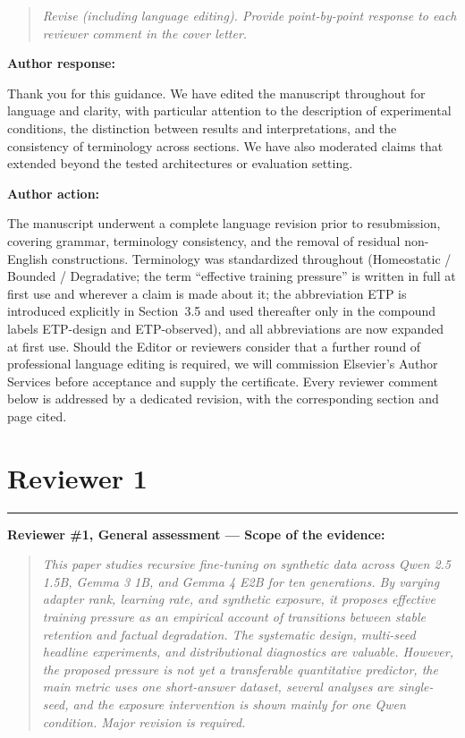 \documentclass[11pt,a4paper]{article}
\newcommand{\rconcern}[3]{%
  \bigskip\noindent\rule{\linewidth}{0.4pt}\par\medskip
  \noindent\textbf{\textcolor{rccolor}{#1 --- #2:}}\par
  \smallskip
  \begin{quote}\itshape\textcolor{rccolor}{#3}\end{quote}%
}
\newcommand{\rquote}[1]{%
  \smallskip\begin{quote}\itshape\textcolor{rccolor}{#1}\end{quote}%
}
\newcommand{\arhead}[1]{\medskip\noindent\textbf{#1}\par\smallskip}
\begin{document}
\rquote{Revise (including language editing). Provide point-by-point response
to each reviewer comment in the cover letter.}

\arhead{Author response:}
Thank you for this guidance. We have edited the manuscript throughout for
language and clarity, with particular attention to the description of
experimental conditions, the distinction between results and
interpretations, and the consistency of terminology across sections. We have
also moderated claims that extended beyond the tested architectures or
evaluation setting.

\arhead{Author action:}
The manuscript underwent a complete language revision prior to
resubmission, covering grammar, terminology consistency, and the
removal of residual non-English constructions. Terminology was
standardized throughout (Homeostatic / Bounded / Degradative;
the term ``effective training pressure'' is written in full at
first use and wherever a claim is made about it; the abbreviation
ETP is introduced explicitly in Section~3.5 and used thereafter
only in the compound labels ETP-design and ETP-observed),
and all abbreviations are now expanded at first use.
Should the Editor or reviewers consider that a further round of
professional language editing is required, we will commission
Elsevier's Author Services before acceptance and supply the certificate.
Every reviewer comment below is addressed by a dedicated
revision, with the corresponding section and page cited.


\section*{Reviewer 1}

\rconcern{Reviewer \#1, General assessment}{Scope of the evidence}{%
This paper studies recursive fine-tuning on synthetic data across
Qwen 2.5 1.5B, Gemma 3 1B, and Gemma 4 E2B for ten generations.
By varying adapter rank, learning rate, and synthetic exposure, it
proposes effective training pressure as an empirical account of
transitions between stable retention and factual degradation.
The systematic design, multi-seed headline experiments, and
distributional diagnostics are valuable. However, the proposed pressure
is not yet a transferable quantitative predictor, the main
metric uses one short-answer dataset, several analyses are single-seed,
and the exposure intervention is shown mainly for one Qwen condition.
Major revision is required.}
\end{document}
